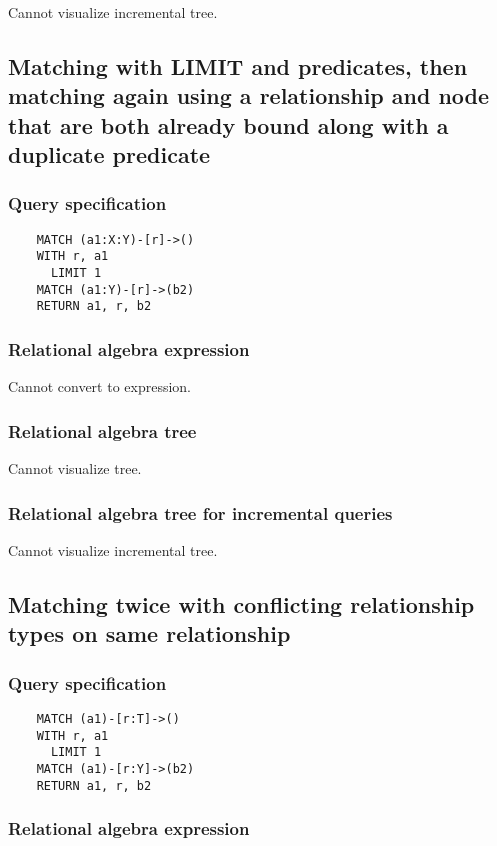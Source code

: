 	Cannot visualize incremental tree.
	\subsection{Matching with LIMIT and predicates, then matching again using a relationship and node that are both already bound along with a duplicate predicate}

	\subsubsection*{Query specification}

	\begin{lstlisting}
	MATCH (a1:X:Y)-[r]->()
	WITH r, a1
	  LIMIT 1
	MATCH (a1:Y)-[r]->(b2)
	RETURN a1, r, b2
	\end{lstlisting}


	\subsubsection*{Relational algebra expression}

	Cannot convert to expression.

	\subsubsection*{Relational algebra tree}

	Cannot visualize tree.

	\subsubsection*{Relational algebra tree for incremental queries}

	Cannot visualize incremental tree.
	\subsection{Matching twice with conflicting relationship types on same relationship}

	\subsubsection*{Query specification}

	\begin{lstlisting}
	MATCH (a1)-[r:T]->()
	WITH r, a1
	  LIMIT 1
	MATCH (a1)-[r:Y]->(b2)
	RETURN a1, r, b2
	\end{lstlisting}


	\subsubsection*{Relational algebra expression}

